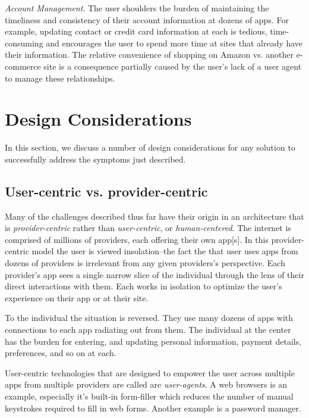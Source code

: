 \documentclass[11pt, oneside]{article}   	%
\begin{document}
\emph{Account Management}. The user shoulders the burden of maintaining the timeliness and consistency of their account information at dozens of apps. For example, updating contact or credit card information at each is tedious, time-consuming and encourages the user to spend more time at sites that already have their information. The relative convenience of shopping on Amazon vs. another e-commerce site is a consequence partially caused by the user's lack of a user agent to manage these relationships.


\section{Design Considerations}%

In this section, we discuss a number of design considerations for any solution to successfully address the symptoms just described.

\subsection{User-centric vs. provider-centric}

Many of the challenges described thus far have their origin in an architecture that is \emph{provider-centric} rather than \emph{user-centric}, or \emph{human-centered}. The internet is comprised of millions of providers, each offering their own app[s]. In this provider-centric model the user is viewed insolation--the fact the that user uses apps from dozens of providers is irrelevant from any given providers's perspective. Each provider's app sees a single narrow slice of the individual through the lens of their direct interactions with them. Each works in isolation to optimize the user's experience on their app or at their site. 

To the individual the situation is reversed. They use many dozens of apps with connections to each app radiating out from them. The individual at the center has the burden for entering, and updating personal information, payment details, preferences, and so on at each.

User-centric technologies that are designed to empower the user across multiple apps from multiple providers are called are \emph{user-agents}. A web browsers is an example, especially it's built-in form-filler which reduces the number of manual keystrokes required to fill in web forms. Another example is a password manager. 
\end{document}
